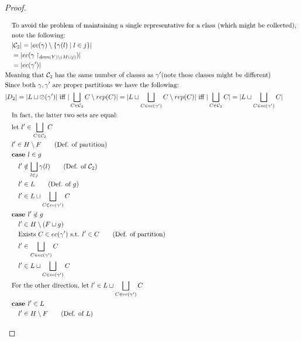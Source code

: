 \documentclass{easychair}
\newcommand{\oh}[1]{\oslash(#1)}
\theoremstyle{definition}
\begin{document}
\begin{proof}
\begin{description}
\begin{align*}
		&\quad \text{To avoid the problem of maintaining a single representative for a class (which might be 
		collected), }\\
		&\quad \text{note the following: }\\
		&\quad |\mathcal{C}_2| = |ec(\gamma) \setminus \{\gamma(l) \mid l \in j\}|\\
		&\quad = |ec(\gamma \restriction_{dom(Y) \setminus (M \sqcup j)})|\\
		&\quad = |ec(\gamma')|\\
		&\text{Meaning that } \mathcal{C}_2 \text{ has the same number of classes as } \gamma' 
			\text{(note these classes might be different)}\\
		&\text{Since both } \gamma,\gamma' \text{ are proper partitions we have the following: }\\
		&|D_2| = |L \sqcup \oh{\gamma'}| \text{ iff } 
			|\bigsqcup_{C  \in \mathcal{C}_2} C \setminus rep(C)| =
			|L \sqcup \bigsqcup_{C \in ec(\gamma')} C \setminus rep(C)|
			\text{ iff }
		|\bigsqcup_{C  \in \mathcal{C}_2} C| = |L \sqcup \bigsqcup_{C \in ec(\gamma')} C|\\ 
		&\quad \text{In fact, the latter two sets are equal: }\\
		&\quad \text{let } l' \in \bigsqcup_{C  \in \mathcal{C}_2} C\\
		&\quad l' \in H \setminus F \tag{Def. of partition}\\
		&\quad \textbf{case } l \in g\\
		&\quad\quad l' \notin \bigsqcup_{l \in j} \gamma(l) \tag{Def. of $\mathcal{C}_2$}\\
		&\quad\quad l' \in L \tag{Def. of $g$}\\
		&\quad\quad l' \in L \sqcup \bigsqcup_{C \in ec(\gamma')} C\\
		&\quad \textbf{case } l' \notin g\\
		&\quad\quad l' \in H \setminus (F \sqcup g)\\
		&\quad\quad \text{Exists } C \in ec(\gamma') \text{ s.t. } l' \in C \tag{Def. of partition}\\
		&\quad\quad l' \in \bigsqcup_{C \in ec(\gamma')} C\\
		&\quad\quad l' \in L \sqcup \bigsqcup_{C \in ec(\gamma')} C\\
		&\quad\text{For the other direction, let } l' \in L \sqcup \bigsqcup_{C \in ec(\gamma')} C\\
		&\quad\textbf{case } l' \in L\\
		&\quad\quad l' \in H \setminus F \tag{Def. of $L$}\\

\end{align*}
\end{description}
\end{proof}
\end{document}
